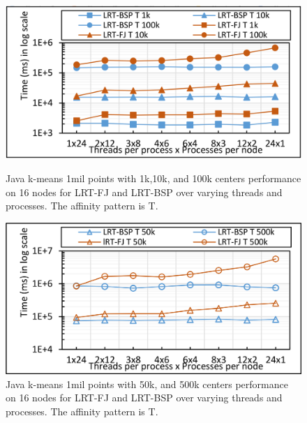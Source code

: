 \documentclass[10pt, conference, compsocconf]{IEEEtran}
\begin{document}
\begin{figure}[!htb]
	\begin{minipage}{0.49\textwidth}
        \centering
        \includegraphics[width=1\columnwidth]{images/fig_kmeans_1mil_varying_centers_by_10k_FJ_vs_BSP_T}
        \caption{Java k-means 1mil points with 1k,10k, and 100k centers performance on 16 nodes for \ac{LRT-FJ} and \ac{LRT-BSP} over varying threads and processes. The affinity pattern is T.}
        \label{fig:fig_kmeans_1mil_varying_centers_by_10k_FJ_vs_BSP_T}
    \end{minipage}
    \hspace{1.4mm}
    \begin{minipage}{0.49\textwidth}
        \centering
        \includegraphics[width=1\columnwidth]{images/fig_kmeans_1mil_varying_centers_as_50k_500k_FJ_vs_BSP_T}
        \caption{Java k-means 1mil points with 50k, and 500k centers performance on 16 nodes for \ac{LRT-FJ} and \ac{LRT-BSP} over varying threads and processes. The affinity pattern is T.}
        \label{fig:fig_kmeans_1mil_varying_centers_as_50k_500k_FJ_vs_BSP_T}
    \end{minipage}
\end{figure}
\end{document}
